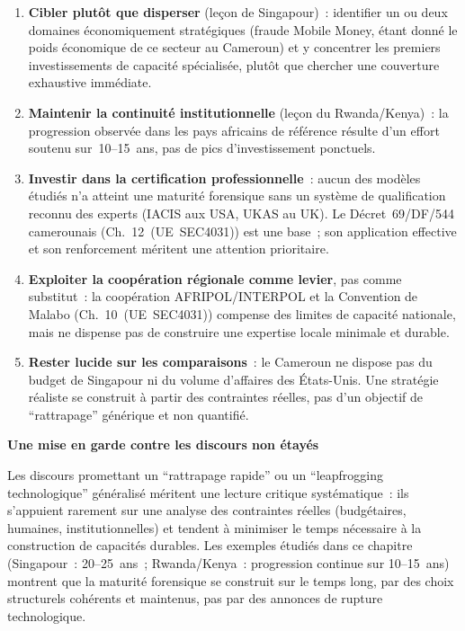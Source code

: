 \begin{enumerate}
    \item \textbf{Cibler plutôt que disperser} (leçon de Singapour)~:
          identifier un ou deux domaines économiquement stratégiques
          (fraude Mobile Money, étant donné le poids économique de
          ce secteur au Cameroun) et y concentrer les premiers
          investissements de capacité spécialisée, plutôt que
          chercher une couverture exhaustive immédiate.
    \item \textbf{Maintenir la continuité institutionnelle}
          (leçon du Rwanda/Kenya)~: la progression observée dans
          les pays africains de référence résulte d'un effort
          soutenu sur~10--15~ans, pas de pics d'investissement
          ponctuels.
    \item \textbf{Investir dans la certification professionnelle}~:
          aucun des modèles étudiés n'a atteint une maturité
          forensique sans un système de qualification reconnu
          des experts (IACIS aux USA, UKAS au UK). Le
          Décret~69/DF/544 camerounais (Ch.~12~(UE~SEC4031))
          est une base~; son application effective et son
          renforcement méritent une attention prioritaire.
    \item \textbf{Exploiter la coopération régionale comme levier},
          pas comme substitut~: la coopération AFRIPOL/INTERPOL et la Convention de Malabo
          (Ch.~10~(UE~SEC4031)) compense des limites de
          capacité nationale, mais ne dispense pas de construire
          une expertise locale minimale et durable.
    \item \textbf{Rester lucide sur les comparaisons}~: le Cameroun
          ne dispose pas du budget de Singapour ni du volume
          d'affaires des États-Unis. Une stratégie réaliste se
          construit à partir des contraintes réelles, pas d'un
          objectif de ``rattrapage'' générique et non quantifié.
\end{enumerate}

\begin{boxalert}
\textbf{Une mise en garde contre les discours non étayés}

Les discours promettant un ``rattrapage rapide'' ou un
``leapfrogging technologique'' généralisé méritent une lecture
critique systématique~: ils s'appuient rarement sur une analyse
des contraintes réelles (budgétaires, humaines, institutionnelles)
et tendent à minimiser le temps nécessaire à la construction de
capacités durables. Les exemples étudiés dans ce chapitre
(Singapour~: 20--25~ans~; Rwanda/Kenya~: progression continue sur
10--15~ans) montrent que la maturité forensique se construit sur
le temps long, par des choix structurels cohérents et maintenus, pas par des annonces de rupture technologique.
\end{boxalert}

